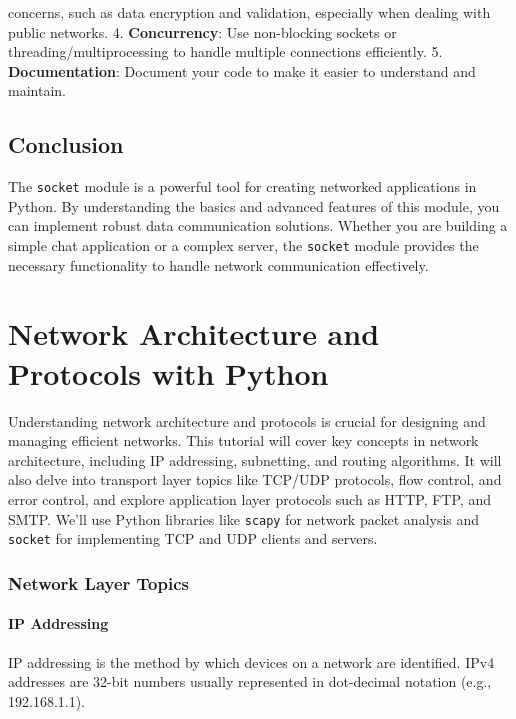\documentclass[
  letterpaper,
  DIV=11,
  numbers=noendperiod]{scrreprt}
\begin{document}
concerns, such as data encryption and validation, especially when
dealing with public networks. 4. \textbf{Concurrency}: Use non-blocking
sockets or threading/multiprocessing to handle multiple connections
efficiently. 5. \textbf{Documentation}: Document your code to make it
easier to understand and maintain.

\section{Conclusion}\label{conclusion-42}

The \texttt{socket} module is a powerful tool for creating networked
applications in Python. By understanding the basics and advanced
features of this module, you can implement robust data communication
solutions. Whether you are building a simple chat application or a
complex server, the \texttt{socket} module provides the necessary
functionality to handle network communication effectively.


\chapter{Network Architecture and Protocols with
Python}\label{network-architecture-and-protocols-with-python}

Understanding network architecture and protocols is crucial for
designing and managing efficient networks. This tutorial will cover key
concepts in network architecture, including IP addressing, subnetting,
and routing algorithms. It will also delve into transport layer topics
like TCP/UDP protocols, flow control, and error control, and explore
application layer protocols such as HTTP, FTP, and SMTP. We'll use
Python libraries like \texttt{scapy} for network packet analysis and
\texttt{socket} for implementing TCP and UDP clients and servers.

\subsection{Network Layer Topics}\label{network-layer-topics}

\subsubsection{IP Addressing}\label{ip-addressing}

IP addressing is the method by which devices on a network are
identified. IPv4 addresses are 32-bit numbers usually represented in
dot-decimal notation (e.g., 192.168.1.1).
\end{document}
